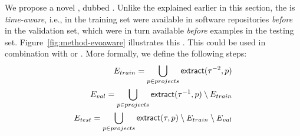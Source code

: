 We propose a novel \methodology, dubbed \emph{\evoaware}.  Unlike the
\methodologies explained earlier in this section, the \evoaware
\methodology is \emph{time-aware}, i.e., \examples in the training set
were available in software repositories \emph{before} \examples in the
validation set, which were in turn available \emph{before} examples in
the testing set.  Figure~\ref{fig:method-evoaware} illustrates this
\methodology.  This \methodology could be used in combination with
\mixedproj or \crossproj.  More formally, we define the following
steps: 
\begin{align*}
  E_{train} = \bigcup_{p \in projects} \mathsf{extract}(\tau^{-2}, p) \\
  E_{val} = \bigcup_{p \in projects} \mathsf{extract}(\tau^{-1}, p) \setminus E_{train} \\
  E_{test} = \bigcup_{p \in projects} \mathsf{extract}(\tau, p) \setminus E_{train} \setminus E_{val} \\
\end{align*}
